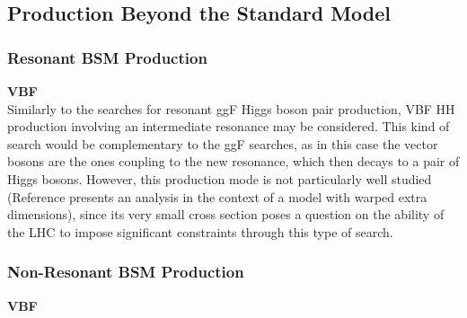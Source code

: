 \subsection{Production Beyond the Standard Model}
\subsubsection{Resonant BSM Production}

\noindent\textbf{VBF}\\
\indent Similarly to the searches for resonant ggF Higgs boson pair production, VBF HH
production involving an intermediate resonance may be considered. This kind of search would be complementary to the ggF searches, as in this case the vector bosons are the ones coupling to the new resonance, which then decays to a pair of Higgs bosons. However, this production mode is not
particularly well studied (Reference \cite{res_vbf} presents an analysis in the context of a model with warped extra dimensions), since its very small cross section poses a question on the ability of the LHC to impose significant constraints through this type of search.

\subsubsection{Non-Resonant BSM Production}

\noindent\textbf{VBF}\\


